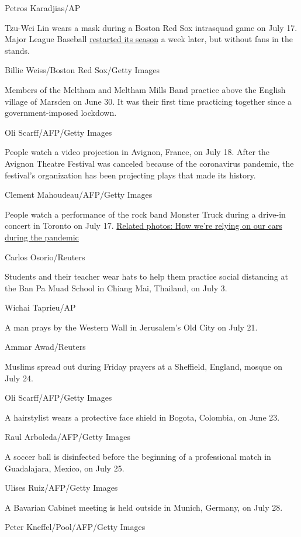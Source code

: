 Petros Karadjias/AP

Tzu-Wei Lin wears a mask during a Boston Red Sox intrasquad game on July
17. Major League Baseball
\href{http://www.cnn.com/2020/07/22/us/gallery/baseball-begins-2020/index.html}{restarted
its season} a week later, but without fans in the stands.

Billie Weiss/Boston Red Sox/Getty Images

Members of the Meltham and Meltham Mills Band practice above the English
village of Marsden on June 30. It was their first time practicing
together since a government-imposed lockdown.

Oli Scarff/AFP/Getty Images

People watch a video projection in Avignon, France, on July 18. After
the Avignon Theatre Festival was canceled because of the coronavirus
pandemic, the festival's organization has been projecting plays that
made its history.

Clement Mahoudeau/AFP/Getty Images

People watch a performance of the rock band Monster Truck during a
drive-in concert in Toronto on July 17.
\href{http://www.cnn.com/2020/05/07/world/gallery/drive-thrus-drive-ins-coronavirus/index.html}{Related
photos: How we're relying on our cars during the pandemic}

Carlos Osorio/Reuters

Students and their teacher wear hats to help them practice social
distancing at the Ban Pa Muad School in Chiang Mai, Thailand, on July 3.

Wichai Taprieu/AP

A man prays by the Western Wall in Jerusalem's Old City on July 21.

Ammar Awad/Reuters

Muslims spread out during Friday prayers at a Sheffield, England, mosque
on July 24.

Oli Scarff/AFP/Getty Images

A hairstylist wears a protective face shield in Bogota, Colombia, on
June 23.

Raul Arboleda/AFP/Getty Images

A soccer ball is disinfected before the beginning of a professional
match in Guadalajara, Mexico, on July 25.

Ulises Ruiz/AFP/Getty Images

A Bavarian Cabinet meeting is held outside in Munich, Germany, on July
28.

Peter Kneffel/Pool/AFP/Getty Images

